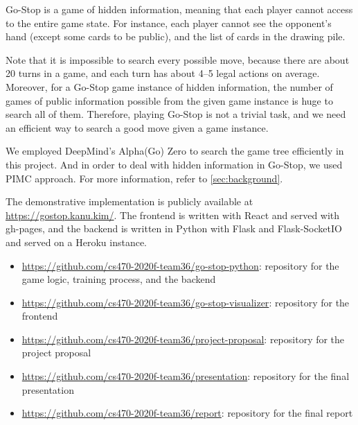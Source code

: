 \documentclass[10pt,twocolumn,letterpaper]{article}
\begin{document}
Go-Stop is a game of hidden information, meaning that each player cannot access to the entire game state. For instance, each player cannot see the opponent's hand (except some cards to be public), and the list of cards in the drawing pile.

Note that it is impossible to search every possible move, because there are about 20 turns in a game, and each turn has about 4--5 legal actions on average. Moreover, for a Go-Stop game instance of hidden information, the number of games of public information possible from the given game instance is huge to search all of them. Therefore, playing Go-Stop is not a trivial task, and we need an efficient way to search a good move given a game instance.

We employed DeepMind's Alpha(Go) Zero \cite{Sil2017} to search the game tree efficiently in this project. And in order to deal with hidden information in Go-Stop, we used PIMC approach. For more information, refer to \cref{sec:background}.

The demonstrative implementation is publicly available at \url{https://gostop.kanu.kim/}. The frontend is written with React and served with gh-pages, and the backend is written in Python with Flask and Flask-SocketIO and served on a Heroku instance.

\begin{itemize}
   \item \url{https://github.com/cs470-2020f-team36/go-stop-python}: repository for the game logic, training process, and the backend
   \item \url{https://github.com/cs470-2020f-team36/go-stop-visualizer}: repository for the frontend
   \item \url{https://github.com/cs470-2020f-team36/project-proposal}: repository for the project proposal
   \item \url{https://github.com/cs470-2020f-team36/presentation}: repository for the final presentation
   \item \url{https://github.com/cs470-2020f-team36/report}: repository for the final report
\end{itemize}


\end{document}
